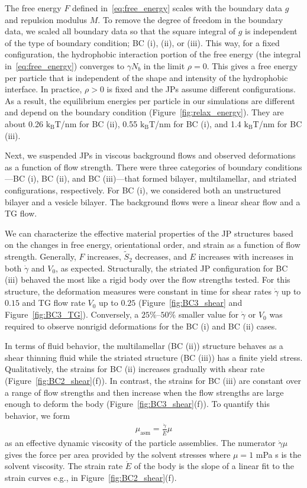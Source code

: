 \documentclass[prb,preprint,showpacs,preprintnumbers,amsmath,amssymb,longbibliography]{revtex4-1}
\begin{document}
The free energy $F$ defined in~\eqref{eq:free_energy} scales with the
boundary data $g$ and repulsion modulus $M$. To remove the degree of
freedom in the boundary data, we scaled all boundary data so that the
square integral of $g$ is independent of the type of boundary condition; BC
(i), (ii), or (iii). This way, for a fixed configuration, the
hydrophobic interaction portion of the free energy (the integral
in~\eqref{eq:free_energy}) converges to $\gamma N_b$ in the limit
$\rho = 0$. This gives a free energy per particle that is independent of
the shape and intensity of the hydrophobic interface. In practice, $\rho
> 0$ is fixed and the JPs assume different configurations. As a result,
the equilibrium energies per particle in our simulations are different
and depend on the boundary condition (Figure~\ref{fig:relax_energy}).
They are about 0.26 $\mathrm{k_BT}$/nm for BC (ii), 0.55
$\mathrm{k_BT}$/nm for BC (i), and 1.4 $\mathrm{k_BT}$/nm for BC (iii).

Next, we suspended JPs in viscous background flows and observed
deformations as a function of flow strength. There were three categories
of boundary conditions---BC (i), BC (ii), and BC (iii)---that formed
bilayer, multilamellar, and striated configurations, respectively. For
BC (i), we considered both an unstructured bilayer and a vesicle
bilayer. The background flows were a linear shear flow and a TG flow.

We can characterize the effective material properties of the JP
structures based on the changes in free energy, orientational order, and
strain as a function of flow strength. Generally, $F$ increases, $\tilde
S_2$ decreases, and $E$ increases with increases in both $\dot \gamma$
and $V_0$, as expected. Structurally, the striated JP configuration for
BC (iii) behaved the most like a rigid body over the flow strengths
tested. For this structure, the deformation measures were constant in
time for shear rates $\dot \gamma$ up to $0.15$ and TG flow rate $V_0$
up to $0.25$ (Figure~\ref{fig:BC3_shear} and Figure~\ref{fig:BC3_TG}).
Conversely, a $25\%$--$50 \%$ smaller value for $\dot \gamma$ or $V_0$ was
required to observe nonrigid deformations for the BC (i) and BC (ii)
cases.

In terms of fluid behavior, the multilamellar (BC (ii)) structure
behaves as a shear thinning fluid while the striated structure (BC (iii))
has a finite yield stress. Qualitatively, the strains for BC (ii)
increases gradually with shear rate (Figure~\ref{fig:BC2_shear}(f)). In
contrast, the strains for BC (iii) are constant over a range of flow
strengths and then increase when the flow strengths are large enough to
deform the body (Figure~\ref{fig:BC3_shear}(f)). To quantify this
behavior, we form 
\begin{align}
\mu_{\text{asm}} = \frac{\dot \gamma}{\dot E} \mu 
\end{align}
as an effective dynamic viscosity of the particle assemblies. The
numerator $\dot \gamma \mu$ gives the force per area provided by the
solvent stresses where $\mu = 1$ mPa s is the solvent viscosity. The
strain rate $\dot E$ of the body is the slope of a linear fit to the
strain curves e.g., in Figure~\ref{fig:BC2_shear}(f).
\end{document}
